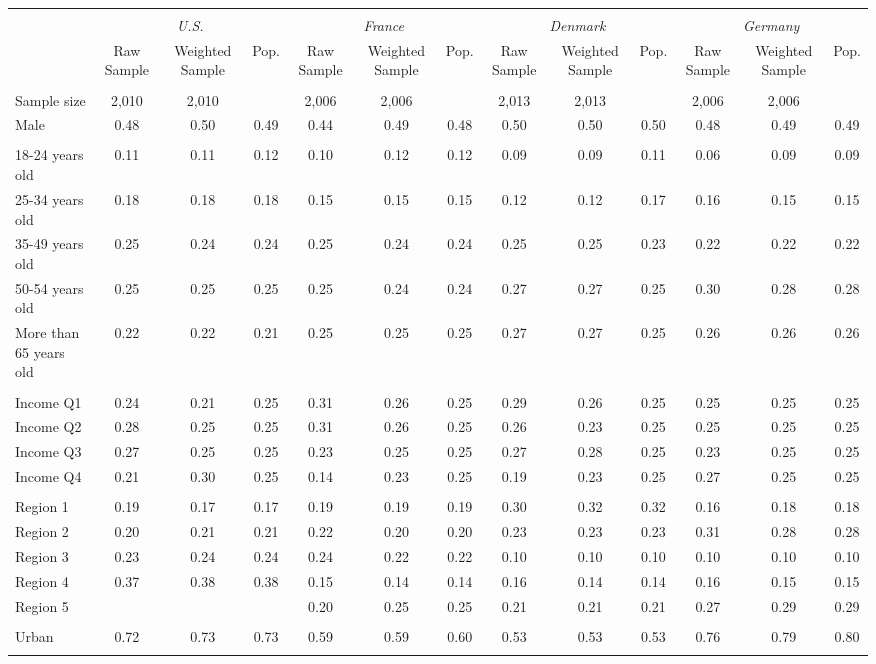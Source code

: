 \begin{tabular}{l*{12}{c}}
\toprule
\hline \\[-1.8ex]
\multicolumn{1}{c}{\em{ }} & \multicolumn{3}{c}{\em{U.S.}} & \multicolumn{3}{c}{\em{France}} & \multicolumn{3}{c}{\em{Denmark}} & \multicolumn{3}{c}{\em{Germany}}\\
\cmidrule(l{3pt}r{3pt}){2-4} \cmidrule(l{3pt}r{3pt}){5-7} \cmidrule(l{3pt}r{3pt}){8-10} \cmidrule(l{3pt}r{3pt}){11-13}
\noalign{\smallskip}  & Raw Sample & Weighted Sample & Pop. & Raw Sample & Weighted Sample & Pop. & Raw Sample & Weighted Sample & Pop. & Raw Sample & Weighted Sample & Pop. \\
\hline \\[-1.8ex] 
Sample size & 2,010 & 2,010 & & 2,006 & 2,006 &  & 2,013 & 2,013 & & 2,006 & 2,006 & \\
\noalign{\smallskip}\hline \noalign{\smallskip}Male & 0.48 & 0.50 & 0.49 & 0.44 & 0.49 & 0.48 & 0.50 & 0.50 & 0.50 & 0.48 & 0.49 & 0.49 \\ 
\\
18-24 years old & 0.11 & 0.11 & 0.12 & 0.10 & 0.12 & 0.12 & 0.09 & 0.09 & 0.11 & 0.06 & 0.09 & 0.09 \\
25-34 years old & 0.18 & 0.18 & 0.18 & 0.15 & 0.15 & 0.15 & 0.12 & 0.12 & 0.17 & 0.16 & 0.15 & 0.15 \\
35-49 years old & 0.25 & 0.24 & 0.24 & 0.25 & 0.24 & 0.24 & 0.25 & 0.25 & 0.23 & 0.22 & 0.22 & 0.22 \\
50-54 years old & 0.25 & 0.25 & 0.25 & 0.25 & 0.24 & 0.24 & 0.27 & 0.27 & 0.25 & 0.30 & 0.28 & 0.28 \\
More than 65 years old & 0.22 & 0.22 & 0.21 & 0.25 & 0.25 & 0.25 & 0.27 & 0.27 & 0.25 & 0.26 & 0.26 & 0.26 \\ 
\\
Income Q1 & 0.24 & 0.21 & 0.25 & 0.31 & 0.26 & 0.25 & 0.29 & 0.26 & 0.25 & 0.25 & 0.25 & 0.25 \\
Income Q2 & 0.28 & 0.25 & 0.25 & 0.31 & 0.26 & 0.25 & 0.26 & 0.23 & 0.25 & 0.25 & 0.25 & 0.25 \\
Income Q3 & 0.27 & 0.25 & 0.25 & 0.23 & 0.25 & 0.25 & 0.27 & 0.28 & 0.25 & 0.23 & 0.25 & 0.25 \\
Income Q4 & 0.21 & 0.30 & 0.25 & 0.14 & 0.23 & 0.25 & 0.19 & 0.23 & 0.25 & 0.27 & 0.25 & 0.25 \\
\\
Region 1 & 0.19 & 0.17 & 0.17 & 0.19 & 0.19 & 0.19 & 0.30 & 0.32 & 0.32 & 0.16 & 0.18 & 0.18 \\
Region 2 & 0.20 & 0.21 & 0.21 & 0.22 & 0.20 & 0.20 & 0.23 & 0.23 & 0.23 & 0.31 & 0.28 & 0.28 \\
Region 3 & 0.23 & 0.24 & 0.24 & 0.24 & 0.22 & 0.22 & 0.10 & 0.10 & 0.10 & 0.10 & 0.10 & 0.10 \\
Region 4 & 0.37 & 0.38 & 0.38 & 0.15 & 0.14 & 0.14 & 0.16 & 0.14 & 0.14 & 0.16 & 0.15 & 0.15 \\
Region 5 & &  &  & 0.20 & 0.25 & 0.25 & 0.21 & 0.21 & 0.21 & 0.27 & 0.29 & 0.29 \\
\\
Urban & 0.72 & 0.73 & 0.73 & 0.59 & 0.59 & 0.60 & 0.53 & 0.53 & 0.53 & 0.76 & 0.79 & 0.80 \\
\\
\bottomrule
\end{tabular}